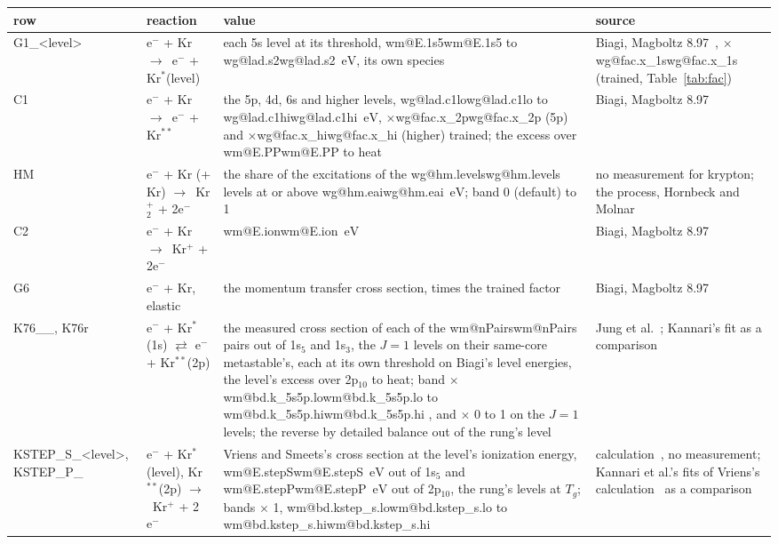 \documentclass[11pt]{article}
\makeatletter
\newcommand\wm[1]{\ifcsname wm@#1\endcsname\csname wm@#1\endcsname
  \else\errmessage{no map number '#1'. Rerun make_system_map_v0_5.py}\fi}
\newcommand\wg[1]{\ifcsname wg@#1\endcsname\csname wg@#1\endcsname
  \else\errmessage{no overview number '#1'. Rerun make_overview_v0_5.py}\fi}
\newcommand{\unit}[1]{\ensuremath{\,\mathrm{#1}}}
\newcommand{\el}{\ensuremath{\mathrm{e}^-}}
\newcommand{\Krs}{Kr\ensuremath{^*}}
\newcommand{\Krpp}{Kr\ensuremath{^{**}}}
\newcommand{\Krp}{Kr\ensuremath{^+}}
\newcommand{\Krtp}{Kr\ensuremath{_2^+}}
\newcommand{\lv}[1]{1s\ensuremath{_#1}}
\newcommand{\ra}{\ensuremath{\to}\ }
\newcommand{\x}[1]{\ensuremath{\times}#1}
\makeatother
\begin{document}
\begin{table}[H]
\centering\scriptsize
\renewcommand{\arraystretch}{1.1}
\begin{tabularx}{\linewidth}{@{}>{\raggedright\arraybackslash}p{2.45cm}>{\raggedright\arraybackslash}p{3.1cm}>{\raggedright\arraybackslash}p{4.75cm}>{\raggedright\arraybackslash}X@{}}
\toprule
row & reaction & value & source\\
\midrule
G1\_<level> & \el{} + Kr \ra \el{} + \Krs(level) & each 5s level at its threshold, \wm{E.1s5} to \wg{lad.s2}\unit{eV}, its own species & Biagi, Magboltz 8.97~\cite{biagi99,pancheshnyi12,carbone21}, \x{\wg{fac.x_1s}} (trained, Table~\ref{tab:fac})\\
C1 & \el{} + Kr \ra \el{} + \Krpp & the 5p, 4d, 6s and higher levels, \wg{lad.c1lo} to \wg{lad.c1hi}\unit{eV}, \x{\wg{fac.x_2p}} (5p) and \x{\wg{fac.x_hi}} (higher) trained; the excess over \wm{E.PP} to heat & Biagi, Magboltz 8.97\\
HM & \el{} + Kr (+ Kr) \ra \Krtp{} + 2\el & the share of the excitations of the \wg{hm.levels} levels at or above \wg{hm.eai}\unit{eV}; band 0 (default) to 1 & no measurement for krypton; the process, Hornbeck and Molnar~\cite{hornbeck51}\\
C2 & \el{} + Kr \ra \Krp{} + 2\el & \wm{E.ion}\unit{eV} & Biagi, Magboltz 8.97\\
G6 & \el{} + Kr, elastic & the momentum transfer cross section, times the trained factor & Biagi, Magboltz 8.97\\
K76\_<1s>\_<2p>, K76r & \el{} + \Krs(1s) $\rightleftarrows$ \el{} + \Krpp(2p) & the measured cross section of each of the \wm{nPairs} pairs out of \lv{5} and \lv{3}, the $J=1$ levels on their same-core metastable's, each at its own threshold on Biagi's level energies, the level's excess over 2p$_{10}$ to heat; band \x{} \wm{bd.k_5s5p.lo} to \wm{bd.k_5s5p.hi}, and \x{} 0 to 1 on the $J=1$ levels; the reverse by detailed balance out of the rung's level & Jung et al.~\cite{jung06,jung05}; Kannari's fit as a comparison~\cite{kannari85,jacob76}\\
KSTEP\_S\_<level>, KSTEP\_P\_<2p> & \el{} + \Krs(level), \Krpp(2p) \ra \Krp{} + 2\el & Vriens and Smeets's cross section at the level's ionization energy, \wm{E.stepS}\unit{eV} out of \lv{5} and \wm{E.stepP}\unit{eV} out of 2p$_{10}$, the rung's levels at $T_g$; bands \x{} 1, \wm{bd.kstep_s.lo} to \wm{bd.kstep_s.hi} & calculation~\cite{vriens80}, no measurement; Kannari et al.'s fits of Vriens's calculation~\cite{kannari85,vriens65} as a comparison\\

\end{tabularx}
\end{table}
\end{document}
